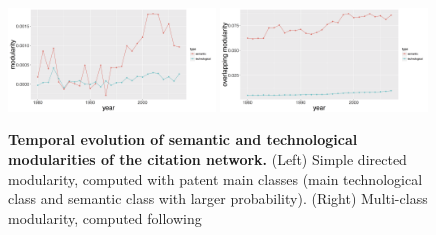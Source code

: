 \documentclass[12pt,twoside,a4paper]{article}
\begin{document}
\begin{figure}[!ht]
\centering
\includegraphics[width=0.49\textwidth]{simplemodularity}
\includegraphics[width=0.49\textwidth]{overlappingmodularity}
\caption{\textbf{Temporal evolution of semantic and technological modularities of the citation network.} (Left) Simple directed modularity, computed with patent main classes (main technological class and semantic class with larger probability). (Right) Multi-class modularity, computed following~\cite{nicosia2009extending} }
\label{fig:modularities}
\end{figure}


\end{document}
